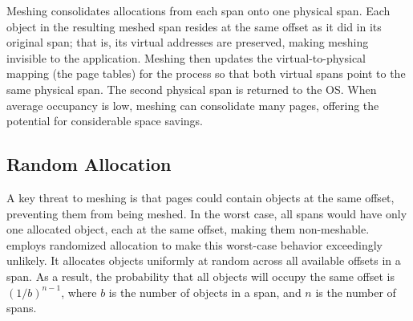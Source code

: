 Meshing consolidates allocations from each span onto one physical span.
Each object in the resulting meshed span resides at the same offset as
it did in its original span; that is, its virtual addresses are
preserved, making meshing invisible to the application. Meshing then
updates the virtual-to-physical mapping (the page tables) for the
process so that both virtual spans point to the same physical
span. The second physical span is returned to the OS.  When average
occupancy is low, meshing can consolidate many pages, offering the
potential for considerable space savings.


\subsection{Random Allocation}

A key threat to meshing is that pages could contain objects at the
same offset, preventing them from being meshed. In the worst case, all
spans would have only one allocated object, each at the same offset,
making them non-meshable. \Mesh{} employs randomized allocation to
make this worst-case behavior exceedingly unlikely. It allocates
objects uniformly at random across all available offsets in a span. As
a result, the probability that all objects will occupy the same offset
is $\left({1}/{b}\right)^{n-1}$, where $b$ is the number of objects in
a span, and $n$ is the number of spans.



